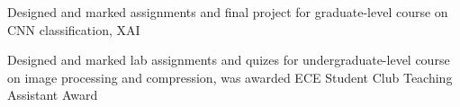 \documentclass[11pt]{cv_style}
\begin{document}

\begin{ditem}
	\item Designed and marked assignments and final project for graduate-level course on CNN classification, XAI
\end{ditem}

\begin{ditem}
	\item Designed and marked lab assignments and quizes for undergraduate-level course on image processing and compression, was awarded ECE Student Club Teaching Assistant Award
\end{ditem}

%
\end{document}
